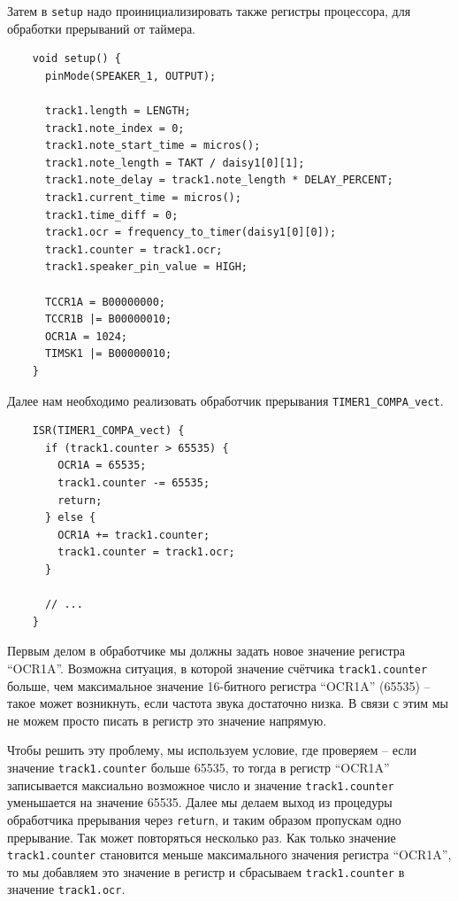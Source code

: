 \documentclass[../sparc.tex]{subfiles}
\begin{document}
Затем в \texttt{setup} надо проинициализировать также регистры
процессора, для обработки прерываний от таймера.

\begin{listing}[H]
  \begin{verbatim}
    void setup() {
      pinMode(SPEAKER_1, OUTPUT);

      track1.length = LENGTH;
      track1.note_index = 0;
      track1.note_start_time = micros();
      track1.note_length = TAKT / daisy1[0][1];
      track1.note_delay = track1.note_length * DELAY_PERCENT;
      track1.current_time = micros();
      track1.time_diff = 0;
      track1.ocr = frequency_to_timer(daisy1[0][0]);
      track1.counter = track1.ocr;
      track1.speaker_pin_value = HIGH;

      TCCR1A = B00000000;
      TCCR1B |= B00000010;
      OCR1A = 1024;
      TIMSK1 |= B00000010;
    }
  \end{verbatim}
  \caption{Инициализация регистров процессора.}
  \label{listing:mcu-music-8}
\end{listing}

Далее нам необходимо реализовать обработчик прерывания
\texttt{TIMER1_COMPA_vect}.

\begin{listing}[H]
  \begin{verbatim}
    ISR(TIMER1_COMPA_vect) {
      if (track1.counter > 65535) {
        OCR1A = 65535;
        track1.counter -= 65535;
        return;
      } else {
        OCR1A += track1.counter;
        track1.counter = track1.ocr;
      }

      // ...
    }
  \end{verbatim}
  \caption{Задание значения для регистра ``OCR1A'' в обработчике прерывания.}
  \label{listing:mcu-music-9}
\end{listing}

Первым делом в обработчике мы должны задать новое значение регистра ``OCR1A''.
Возможна ситуация, в которой значение счётчика \texttt{track1.counter}
больше, чем максимальное значение 16-битного регистра ``OCR1A'' (65535) -- такое
может возникнуть, если частота звука достаточно низка.  В связи с этим мы не
можем просто писать в регистр это значение напрямую.

Чтобы решить эту проблему, мы используем условие, где проверяем -- если значение
\texttt{track1.counter} больше 65535, то тогда в регистр ``OCR1A''
записывается максиально возможное число и значение
\texttt{track1.counter} уменьшается на значение 65535.  Далее мы делаем
выход из процедуры обработчика прерывания через \texttt{return}, и
таким образом пропускам одно прерывание.  Так может повторяться несколько раз.
Как только значение \texttt{track1.counter} становится меньше
максимального значения регистра ``OCR1A'', то мы добавляем это значение в
регистр и сбрасываем \texttt{track1.counter} в значение
\texttt{track1.ocr}.
\end{document}
